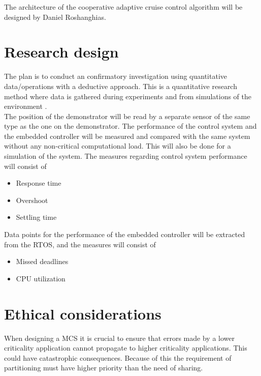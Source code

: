 The architecture of the cooperative adaptive cruise control algorithm will be designed by Daniel Roshanghias.\\


\section{Research design}
\label{sec:research}
The plan is to conduct an confirmatory investigation using quantitative data/operations with a deductive approach. This is a quantitative research method where data is gathered during experiments and from simulations of the environment \cite{hakansson2013}. \\ %

The position of the demonstrator will be read by a separate sensor of the same type as the one on the demonstrator. The performance of the control system and the embedded controller will be measured and compared with the same system without any non-critical computational load. This will also be done for a simulation of the system. The measures regarding control system performance will consist of 
\begin{itemize}
\item Response time
\item Overshoot
\item Settling time %
\end{itemize}

Data points for the performance of the embedded controller will be extracted from the RTOS, and the measures will consist of
\begin{itemize}
\item Missed deadlines
\item CPU utilization
\end{itemize}

\section{Ethical considerations}
When designing a MCS it is crucial to ensure that errors made by a lower criticality application cannot propagate to higher criticality applications. This could have catastrophic consequences. Because of this the requirement of partitioning must have higher priority than the need of sharing.
